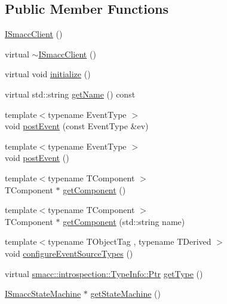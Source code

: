 \subsection*{Public Member Functions}
\begin{DoxyCompactItemize}
\item 
\hyperlink{classsmacc_1_1ISmaccClient_a40222ad8b9b7962755434025b1fd5ae7}{I\+Smacc\+Client} ()
\item 
virtual \hyperlink{classsmacc_1_1ISmaccClient_a030e17771bf2e404a6fad97273c4d7f4}{$\sim$\+I\+Smacc\+Client} ()
\item 
virtual void \hyperlink{classsmacc_1_1ISmaccClient_a974ebb6ad6cf812e7b9de6b78b3d901f}{initialize} ()
\item 
virtual std\+::string \hyperlink{classsmacc_1_1ISmaccClient_a20846aabfd1de832aa27d7a8237a1742}{get\+Name} () const 
\item 
{\footnotesize template$<$typename Event\+Type $>$ }\\void \hyperlink{classsmacc_1_1ISmaccClient_a46cbc0d695214efe40d29247323bfc80}{post\+Event} (const Event\+Type \&ev)
\item 
{\footnotesize template$<$typename Event\+Type $>$ }\\void \hyperlink{classsmacc_1_1ISmaccClient_a21a79203cb44fc717d4d977c190327c6}{post\+Event} ()
\item 
{\footnotesize template$<$typename T\+Component $>$ }\\T\+Component $\ast$ \hyperlink{classsmacc_1_1ISmaccClient_adef78db601749ca63c19e74a27cb88cc}{get\+Component} ()
\item 
{\footnotesize template$<$typename T\+Component $>$ }\\T\+Component $\ast$ \hyperlink{classsmacc_1_1ISmaccClient_ad72cba3ce7c5b3bd3977747dc6d5fb69}{get\+Component} (std\+::string name)
\item 
{\footnotesize template$<$typename T\+Object\+Tag , typename T\+Derived $>$ }\\void \hyperlink{classsmacc_1_1ISmaccClient_a643285b93f2bd33987e0d0d1a12caf10}{configure\+Event\+Source\+Types} ()
\item 
virtual \hyperlink{classsmacc_1_1introspection_1_1TypeInfo_aa6ffd9c39811d59f7c771941b7fad860}{smacc\+::introspection\+::\+Type\+Info\+::\+Ptr} \hyperlink{classsmacc_1_1ISmaccClient_ae7faf4e40510c73810e6b0ef9fec8f33}{get\+Type} ()
\item 
\hyperlink{classsmacc_1_1ISmaccStateMachine}{I\+Smacc\+State\+Machine} $\ast$ \hyperlink{classsmacc_1_1ISmaccClient_aec51d4712404cb9882b86e4c854bb93a}{get\+State\+Machine} ()

\end{DoxyCompactItemize}
